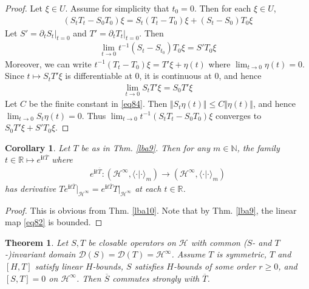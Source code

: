 \documentclass[12pt,b5paper,notitlepage]{article}
\theoremstyle{definition}
\theoremstyle{plain}
\newtheorem{thm}[df]{Theorem}
\newtheorem{co}[df]{Corollary}
\newcommand{\mc}{\mathcal}
\newcommand{\ovl}{\overline}
\newcommand{\Dom}{\scr{D}}
\newcommand{\bk}[1]{\langle {#1}\rangle}
\newcommand{\scr}{\mathscr}
\newcommand{\im}{\mathbf{i}}
\newcommand{\Nbb}{\mathbb N}
\newcommand{\Rbb}{\mathbb R}
\numberwithin{equation}{section}
\begin{document}
\begin{proof}
Let $\xi\in U$. Assume for simplicity that $t_0=0$. Then for each $\xi\in U$,
\begin{align*}
(S_t T_t-S_0T_0)\xi=S_t(T_t-T_0)\xi+(S_t-S_0)T_0\xi
\end{align*}
Let $S'=\partial_t S_t|_{t=0}$ and $T'=\partial_t T_t|_{t=0}$. Then
\begin{align*}
\lim_{t\rightarrow0}t^{-1}(S_t-S_{t_0})T_0\xi=S'T_0\xi
\end{align*}
Moreover, we can write $t^{-1}(T_t-T_0)\xi=T'\xi+\eta(t)$ where $\lim_{t\rightarrow0}\eta(t)=0$. Since $t\mapsto S_tT'\xi$ is differentiable at $0$, it is continuous at $0$, and hence
\begin{align*}
\lim_{t\rightarrow 0}S_tT'\xi=S_0T'\xi
\end{align*}
Let $C$ be the finite constant in \eqref{eq84}. Then $\Vert S_t\eta(t)\Vert\leq C\Vert\eta(t)\Vert$, and hence $\lim_{t\rightarrow 0}S_t\eta(t)=0$. Thus $\lim_{t\rightarrow0}t^{-1}(S_t T_t-S_0T_0)\xi$ converges to $S_0T'\xi+S'T_0\xi$.
\end{proof}








\begin{co}\label{lb61}
Let $T$ be as in Thm. \ref{lba9}. Then for any $m\in\Nbb$, the family $t\in\Rbb\mapsto e^{\im t\ovl T}$ where
\begin{align}\label{eq82}
e^{\im t\ovl T}:(\mc H^\infty,\bk{\cdot|\cdot}_m)\rightarrow (\mc H^\infty,\bk{\cdot|\cdot}_m)
\end{align}
has derivative $Te^{\im t\ovl T}\big|_{\mc H^\infty}=e^{\im t\ovl T}T\big|_{\mc H^\infty}$ at each $t\in\Rbb$.
\end{co}

\begin{proof}
This is obvious from Thm. \ref{lba10}. Note that by Thm. \ref{lba9}, the linear map \eqref{eq82} is bounded.
\end{proof}


	
\begin{thm}\label{lb63}
Let $S,T$ be closable operators on $\mc H$ with common ($S$- and $T$-)invariant domain $\Dom(S)=\Dom(T)=\mc H^\infty$. Assume $T$ is symmetric, $T$ and $[H,T]$ satisfy linear $H$-bounds,  $S$ satisfies $H$-bounds of some order $r\geq 0$, and $[S,T]=0$ on $\mc H^\infty$. Then $\ovl S$ commutes strongly with $\ovl T$.
\end{thm}	
	
\end{document}
